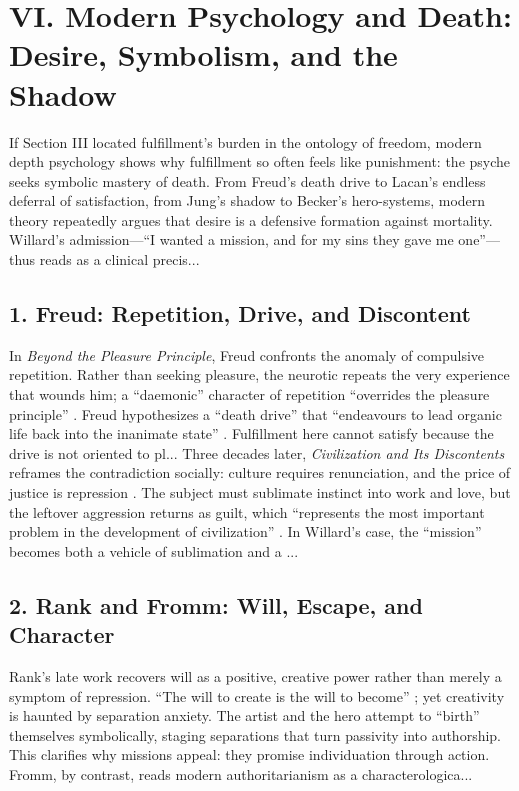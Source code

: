 \section*{VI. Modern Psychology and Death: Desire, Symbolism, and the Shadow}
\label{sec:vi-modern-psychology-and-death-desire-symbolism-and-the-shadow}

If Section III located fulfillment’s burden in the ontology of freedom, modern depth psychology shows why fulfillment so often feels like punishment: the psyche seeks symbolic mastery of death. From Freud’s death drive to Lacan’s endless deferral of satisfaction, from Jung’s shadow to Becker’s hero-systems, modern theory repeatedly argues that desire is a defensive formation against mortality. Willard’s admission---``I wanted a mission, and for my sins they gave me one''---thus reads as a clinical precis...
\subsection*{1. Freud: Repetition, Drive, and Discontent}
\label{ssec:1-freud-repetition-drive-and-discontent}
In \textit{Beyond the Pleasure Principle}, Freud confronts the anomaly of compulsive repetition. Rather than seeking pleasure, the neurotic repeats the very experience that wounds him; a ``daemonic'' character of repetition ``overrides the pleasure principle'' \parencite[p.~22]{FreudBeyond1955}. Freud hypothesizes a ``death drive'' that ``endeavours to lead organic life back into the inanimate state'' \parencite[p.~38]{FreudBeyond1955}. Fulfillment here cannot satisfy because the drive is not oriented to pl...
Three decades later, \textit{Civilization and Its Discontents} reframes the contradiction socially: culture requires renunciation, and the price of justice is repression \parencite{FreudCivilization1961}. The subject must sublimate instinct into work and love, but the leftover aggression returns as guilt, which ``represents the most important problem in the development of civilization'' \parencite[p.~97]{FreudCivilization1961}. In Willard’s case, the ``mission'' becomes both a vehicle of sublimation and a ...
\subsection*{2. Rank and Fromm: Will, Escape, and Character}
\label{ssec:2-rank-and-fromm-will-escape-and-character}
Rank’s late work recovers will as a positive, creative power rather than merely a symptom of repression. ``The will to create is the will to become'' \parencite[p.~xx]{RankWill1978}; yet creativity is haunted by separation anxiety. The artist and the hero attempt to ``birth'' themselves symbolically, staging separations that turn passivity into authorship. This clarifies why missions appeal: they promise individuation through action. Fromm, by contrast, reads modern authoritarianism as a characterologica...
